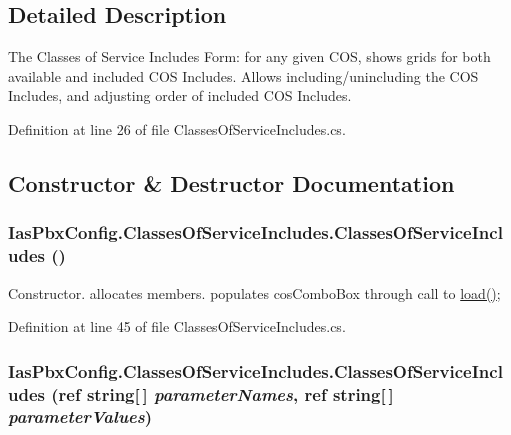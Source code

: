 \subsection{Detailed Description}
The Classes of Service Includes Form: for any given COS, shows grids for both available and included COS Includes. Allows including/unincluding the COS Includes, and adjusting order of included COS Includes. 

Definition at line 26 of file ClassesOfServiceIncludes.cs.

\subsection{Constructor \& Destructor Documentation}
\hypertarget{class_ias_pbx_config_1_1_classes_of_service_includes_aa06075d98cbf9682a7d70b214235e0b8}{
\subsubsection[{ClassesOfServiceIncludes}]{\setlength{\rightskip}{0pt plus 5cm}IasPbxConfig.ClassesOfServiceIncludes.ClassesOfServiceIncludes ()}}
\label{class_ias_pbx_config_1_1_classes_of_service_includes_aa06075d98cbf9682a7d70b214235e0b8}


Constructor. allocates members. populates cosComboBox through call to \hyperlink{class_ias_pbx_config_1_1_classes_of_service_includes_afba25c0ca7c6b26bcd5e8b6984758908}{load()}; 

Definition at line 45 of file ClassesOfServiceIncludes.cs.\hypertarget{class_ias_pbx_config_1_1_classes_of_service_includes_a3775e0a1f9a546857f5ca4ae6cc83786}{
\subsubsection[{ClassesOfServiceIncludes}]{\setlength{\rightskip}{0pt plus 5cm}IasPbxConfig.ClassesOfServiceIncludes.ClassesOfServiceIncludes (ref string\mbox{[}$\,$\mbox{]} {\em parameterNames}, \/  ref string\mbox{[}$\,$\mbox{]} {\em parameterValues})}}
\label{class_ias_pbx_config_1_1_classes_of_service_includes_a3775e0a1f9a546857f5ca4ae6cc83786}


